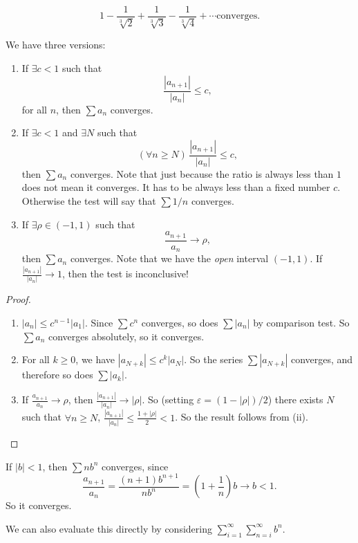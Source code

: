 \documentclass[a4paper]{article}
\begin{document}
\begin{eg}
  \[
    1 - \frac{1}{\sqrt[3]{2}} + \frac{1}{\sqrt[3]{3}} - \frac{1}{\sqrt[3]{4}} + \cdots \text{converges}.
  \]
\end{eg}

\begin{lemma}
  We have three versions:
  \begin{enumerate}
    \item If $\exists c < 1$ such that
      \[
        \frac{|a_{n + 1}|}{|a_n|} \leq c,
      \]
      for all $n$, then $\sum a_n$ converges.
    \item If $\exists c < 1$ and $\exists N$ such that
      \[
        (\forall n \geq N)\, \frac{|a_{n + 1}|}{|a_n|} \leq c,
      \]
      then $\sum a_n$ converges. Note that just because the ratio is always less than $1$ does not mean it converges. It has to be always less than a fixed number $c$. Otherwise the test will say that $\sum 1/n$ converges.
    \item If $\exists \rho \in (-1, 1)$ such that
      \[
        \frac{a_{n + 1}}{a_n} \to \rho,
      \]
      then $\sum a_n$ converges. Note that we have the \emph{open} interval $(-1, 1)$. If $\frac{|a_{n + 1}|}{|a_n|} \to 1$, then the test is inconclusive!
  \end{enumerate}
\end{lemma}

\begin{proof}\leavevmode
  \begin{enumerate}
    \item $|a_n| \leq c^{n - 1}|a_1|$. Since $\sum c^n$ converges, so does $\sum |a_n|$ by comparison test. So $\sum a_n$ converges absolutely, so it converges.
    \item For all $k\geq 0$, we have $|a_{N + k}|\leq c^k|a_N|$. So the series $\sum |a_{N + k}|$ converges, and therefore so does $\sum |a_k|$.
    \item If $\frac{a_{n + 1}}{a_n} \to \rho$, then $\frac{|a_{n + 1}|}{|a_n|} \to |\rho|$. So (setting $\varepsilon = (1 - |\rho|)/2$) there exists $N$ such that $\forall n \geq N$, $\frac{|a_{n + 1}|}{|a_n|} \leq \frac{1 + |\rho|}{2} < 1$. So the result follows from (ii).
  \end{enumerate}
\end{proof}

\begin{eg}
  If $|b| < 1$, then $\sum nb^n$ converges, since
  \[
    \frac{a_{n + 1}}{a_n} = \frac{(n + 1) b^{n + 1}}{nb^n} = \left(1 + \frac{1}{n}\right) b\to b < 1.
  \]
  So it converges.

  We can also evaluate this directly by considering $\displaystyle\sum_{i = 1}^\infty \sum_{n = i}^\infty b^n$.
\end{eg}
\end{document}
